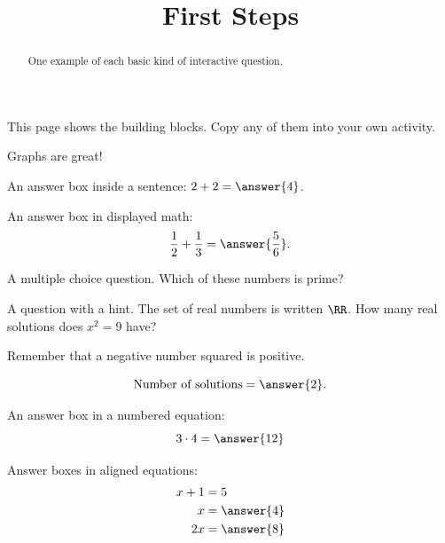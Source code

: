 \documentclass{ximera}
\title{First Steps}
\begin{document}
\begin{abstract}
One example of each basic kind of interactive question.
\end{abstract}
\maketitle

This page shows the building blocks. Copy any of them into your own activity.

Graphs are great! 

\begin{problem}
An answer box inside a sentence: $2+2=\answer{4}$.
\end{problem}

\begin{problem}
An answer box in displayed math:
\[
\frac{1}{2}+\frac{1}{3}=\answer{\frac{5}{6}}.
\]
\end{problem}

\begin{problem}
A multiple choice question. Which of these numbers is prime?

\begin{multipleChoice}
\end{multipleChoice}
\end{problem}

\begin{problem}
A question with a hint. The set of real numbers is written $\RR$. How many
real solutions does $x^2=9$ have?

\begin{hint}
Remember that a negative number squared is positive.
\end{hint}

\[
\text{Number of solutions}=\answer{2}.
\]
\end{problem}

\begin{problem}
An answer box in a numbered equation:
\begin{equation}
3\cdot 4=\answer{12}
\end{equation}
\end{problem}

\begin{problem}
Answer boxes in aligned equations:
\begin{align*}
x+1&=5 \\
x&=\answer{4} \\
2x&=\answer{8}
\end{align*}
\end{problem}
\end{document}
